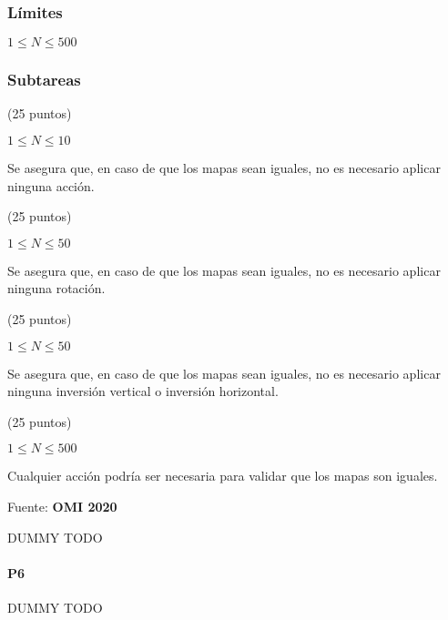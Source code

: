 \subsubsection*{Límites}
\(1 \leq N \leq 500\)
\subsubsection*{Subtareas}
\begin{plimits}
	\item (25 puntos)
	\begin{plimits}
		\item \(1\leq N \leq 10\)
		\item Se asegura que, en caso de que los mapas sean iguales, no es necesario aplicar ninguna acción.
	\end{plimits}
	\item (25 puntos)
	\begin{plimits}
		\item \(1\leq N \leq 50\)
		\item Se asegura que, en caso de que los mapas sean iguales, no es necesario aplicar ninguna rotación.
	\end{plimits}
	\item (25 puntos)
	\begin{plimits}
		\item \(1\leq N \leq 50\)
		\item Se asegura que, en caso de que los mapas sean iguales, no es necesario aplicar ninguna inversión vertical o inversión horizontal.
	\end{plimits}
	\item (25 puntos)
	\begin{plimits}
		\item \(1\leq N \leq 500\)
		\item Cualquier acción podría ser necesaria para validar que los mapas son iguales.
	\end{plimits}
\end{plimits}
 Fuente: \textbf{OMI 2020}
 
 
 
 \problembreak
 
\problemtitle DUMMY TODO
 
 
 \problembreak
 
 \paragraph{P6} DUMMY TODO


